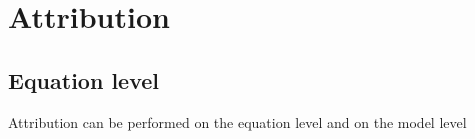 \documentclass[letterpaper,10pt,english]{sphinxmanual}
\begin{document}
\begin{fulllineitems}

\begin{fulllineitems}
\label{\detokenize{onboard/modelmacrograb:modelmacrograb.GrabMacroModel.make_fitted}}
\pysigstartsignatures
{}
\pysigstopsignatures
\end{fulllineitems}


\begin{fulllineitems}
\label{\detokenize{onboard/modelmacrograb:modelmacrograb.GrabMacroModel.add_add_factor}}
\pysigstartsignatures
{}
\pysigstopsignatures
\end{fulllineitems}


\begin{fulllineitems}
\label{\detokenize{onboard/modelmacrograb:modelmacrograb.GrabMacroModel.debug}}
\pysigstartsignatures
{}
\pysigstopsignatures
\end{fulllineitems}


\end{fulllineitems}


\sphinxstepscope


\section{Attribution}
\label{\detokenize{attribution/Attribution:attribution}}\label{\detokenize{attribution/Attribution::doc}}

\subsection{Equation level}
\label{\detokenize{attribution/Attribution:equation-level}}
\sphinxAtStartPar
Attribution can be performed on the equation level and on the model level
\end{document}
